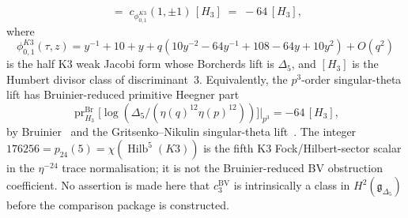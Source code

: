 \begin{theorem}
\begin{equation}
 \;=\;
 c_{\phi_{0,1}^{K3}}(1,\pm1)\,[H_3]
 \;=\;
 -64\,[H_3],
\end{equation}
where
\[
\phi_{0,1}^{K3}(\tau,z)
=y^{-1}+10+y
+q(10y^{-2}-64y^{-1}+108-64y+10y^2)+O(q^2)
\]
is the half K3 weak Jacobi form whose Borcherds lift is \(\Delta_5\), and
$[H_3]$ is the Humbert divisor class of discriminant~$3$. Equivalently,
the $p^3$-order
singular-theta lift has Bruinier-reduced primitive Heegner part
\[
 \operatorname{pr}_{H_3}^{\mathrm{Br}}
 \bigl[\log(\Delta_5/(\eta(q)^{12}\eta(p)^{12}))\bigr]\big|_{p^3}
 =
 -64\,[H_3],
\]
by Bruinier~\cite[Prop.~5.1, Thm.~5.12]{Bruinier2002} and the
Gritsenko--Nikulin singular-theta lift~\cite[Thm.~2.1]{GritsenkoNikulin1998}.
The integer
$176256=p_{24}(5)=\chi(\operatorname{Hilb}^5(K3))$ is the fifth
K3 Fock/Hilbert-sector scalar in the $\eta^{-24}$ trace normalisation;
it is not the Bruinier-reduced BV obstruction coefficient.
No assertion is made here that \(c_3^{\mathrm{BV}}\) is intrinsically a
class in \(H^2(\mathfrak{g}_{\Delta_5})\) before the comparison package
is constructed.
\end{theorem}


